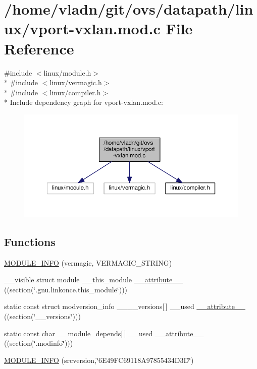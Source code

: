 \hypertarget{vport-vxlan_8mod_8c}{}\section{/home/vladn/git/ovs/datapath/linux/vport-\/vxlan.mod.\+c File Reference}
\label{vport-vxlan_8mod_8c}
{\ttfamily \#include $<$linux/module.\+h$>$}\\*
{\ttfamily \#include $<$linux/vermagic.\+h$>$}\\*
{\ttfamily \#include $<$linux/compiler.\+h$>$}\\*
Include dependency graph for vport-\/vxlan.mod.\+c\+:
\nopagebreak
\begin{figure}[H]
\begin{center}
\leavevmode
\includegraphics[width=350pt]{vport-vxlan_8mod_8c__incl}
\end{center}
\end{figure}
\subsection*{Functions}
\begin{DoxyCompactItemize}
\item 
\hyperlink{vport-vxlan_8mod_8c_a59ae061e50f755cbc9dbde3c6688273a}{M\+O\+D\+U\+L\+E\+\_\+\+I\+N\+F\+O} (vermagic, V\+E\+R\+M\+A\+G\+I\+C\+\_\+\+S\+T\+R\+I\+N\+G)
\item 
\+\_\+\+\_\+visible struct module \+\_\+\+\_\+this\+\_\+module \hyperlink{vport-vxlan_8mod_8c_acc22bca8fb9ed0433181b5c98efdb5a4}{\+\_\+\+\_\+attribute\+\_\+\+\_\+} ((section(\char`\"{}.gnu.\+linkonce.\+this\+\_\+module\char`\"{})))
\item 
static const struct modversion\+\_\+info \+\_\+\+\_\+\+\_\+\+\_\+versions\mbox{[}$\,$\mbox{]} \+\_\+\+\_\+used \hyperlink{vport-vxlan_8mod_8c_a3457b560a580904370cd8cbaddb0c902}{\+\_\+\+\_\+attribute\+\_\+\+\_\+} ((section(\char`\"{}\+\_\+\+\_\+versions\char`\"{})))
\item 
static const char \+\_\+\+\_\+module\+\_\+depends\mbox{[}$\,$\mbox{]} \+\_\+\+\_\+used \hyperlink{vport-vxlan_8mod_8c_aebedc6dfadccd01faf3f462d4fa936f7}{\+\_\+\+\_\+attribute\+\_\+\+\_\+} ((section(\char`\"{}.modinfo\char`\"{})))
\item 
\hyperlink{vport-vxlan_8mod_8c_a2415e014fa1ed2bd1fe7776eb2feb536}{M\+O\+D\+U\+L\+E\+\_\+\+I\+N\+F\+O} (srcversion,\char`\"{}6\+E49\+F\+C69118\+A97855434\+D3\+D\char`\"{})
\end{DoxyCompactItemize}


